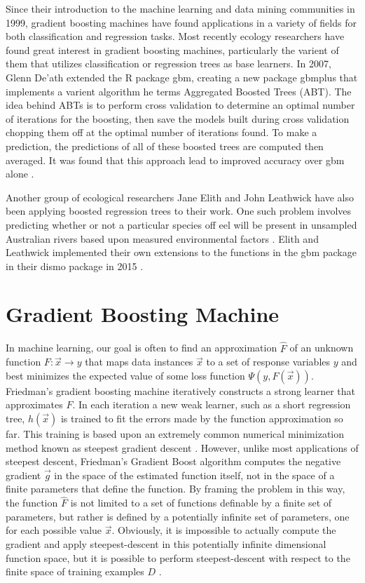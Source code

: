 \documentclass[runningheads]{llncs}
\begin{document}
Since their introduction to the machine learning and data mining communities in 1999, gradient boosting machines have found applications in a variety of fields for both classification and regression tasks. Most recently ecology researchers have found great interest in gradient boosting machines, particularly the varient of them that utilizes classification or regression trees as base learners. In 2007, Glenn De'ath extended the R package gbm, creating a new package gbmplus that implements a varient algorithm he terms Aggregated Boosted Trees (ABT). The idea behind ABTs is to perform cross validation to determine an optimal number of iterations for the boosting, then save the models built during cross validation chopping them off at the optimal number of iterations found. To make a prediction, the predictions of all of these boosted trees are computed then averaged. It was found that this approach lead to improved accuracy over gbm alone \cite{death2007ABT}. 

Another group of ecological researchers Jane Elith and John Leathwick have also been applying boosted regression trees to their work. One such problem involves predicting whether or not a particular species off eel will be present in unsampled Australian rivers based upon measured environmental factors \cite{ecological}.  Elith and Leathwick implemented their own extensions to the functions in the gbm package in their dismo package in 2015 \cite{elith2015boosted}. 


\section{Gradient Boosting Machine} 
In machine learning, our goal is often to find an approximation \(\hat{F}\) of an unknown function \(F: \vec{x} \rightarrow y\) that maps data instances \(\vec{x}\) to a set of response variables \(y\) and best minimizes the expected value of some loss function \( \Psi(y, F(\vec{x})) \). 
 Friedman's gradient boosting machine iteratively constructs a strong learner that approximates \(F\). In each iteration a new weak learner, such as a short regression tree, \(h(\vec{x})\) is trained to fit the errors made by the function approximation so far. This training is based upon an extremely common numerical minimization method known as steepest gradient descent \cite{2001Friedman} \cite{2012ridgeway}. 
However, unlike most applications of steepest descent, Friedman's Gradient Boost algorithm computes the negative gradient \(\vec{g}\) in the space of the estimated function itself, not in the space of a finite parameters that define the function. By framing the problem in this way, the function \(\hat{F}\) is not limited to a set of functions definable by a finite set of parameters, but rather is defined by a potentially infinite set of parameters, one for each possible value \(\vec{x}\). Obviously, it is impossible to actually compute the gradient and apply steepest-descent in this potentially infinite dimensional function space, but it is possible to perform steepest-descent with respect to the finite space of training examples \(D\) \cite{2001Friedman} \cite{2012ridgeway}. 
\end{document}
